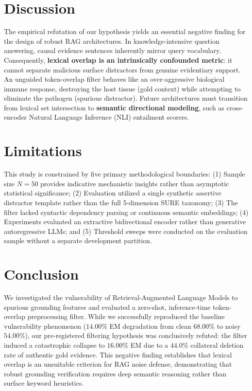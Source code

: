 \documentclass[conference]{IEEEtran}
\begin{document}
\section{Discussion}
The empirical refutation of our hypothesis yields an essential negative finding for the design of robust RAG architectures. In knowledge-intensive question answering, causal evidence sentences inherently mirror query vocabulary. Consequently, \textbf{lexical overlap is an intrinsically confounded metric}: it cannot separate malicious surface distractors from genuine evidentiary support. An unguided token-overlap filter behaves like an over-aggressive biological immune response, destroying the host tissue (gold context) while attempting to eliminate the pathogen (spurious distractor). Future architectures must transition from lexical set intersection to \textbf{semantic directional modeling}, such as cross-encoder Natural Language Inference (NLI) entailment scorers.

\section{Limitations}
This study is constrained by five primary methodological boundaries: (1) Sample size $N=50$ provides indicative mechanistic insights rather than asymptotic statistical significance; (2) Evaluation utilized a single synthetic assertive distractor template rather than the full 5-dimension SURE taxonomy; (3) The filter lacked syntactic dependency parsing or continuous semantic embeddings; (4) Experiments evaluated an extractive bidirectional encoder rather than generative autoregressive LLMs; and (5) Threshold sweeps were conducted on the evaluation sample without a separate development partition.

\section{Conclusion}
We investigated the vulnerability of Retrieval-Augmented Language Models to spurious grounding features and evaluated a zero-shot, inference-time token-overlap preprocessing filter. While we successfully reproduced the baseline vulnerability phenomenon ($14.00\%$ EM degradation from clean $68.00\%$ to noisy $54.00\%$), our pre-registered filtering hypothesis was conclusively refuted: the filter induced a catastrophic collapse to $16.00\%$ EM due to a $44.0\%$ collateral deletion rate of authentic gold evidence. This negative finding establishes that lexical overlap is an unsuitable criterion for RAG noise defense, demonstrating that robust grounding verification requires deep semantic reasoning rather than surface keyword heuristics.
\end{document}

